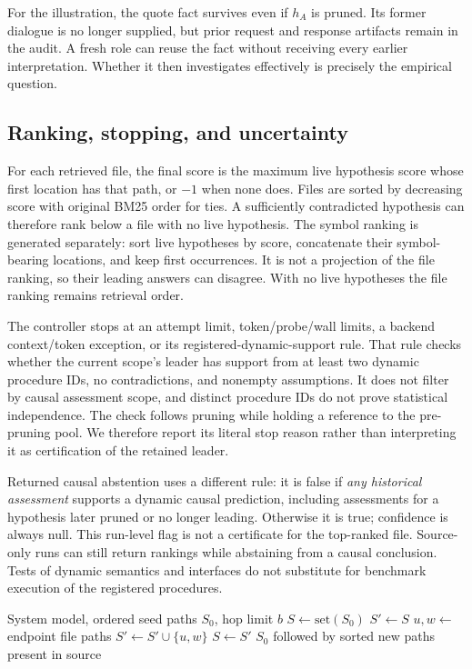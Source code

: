 \documentclass[letterpaper,journal]{IEEEtran}
\newcommand{\code}[1]{\texttt{\detokenize{#1}}}
\begin{document}
For the illustration, the quote fact survives even if $h_A$ is pruned. Its former dialogue is no longer supplied, but prior request and response artifacts remain in the audit. A fresh role can reuse the fact without receiving every earlier interpretation. Whether it then investigates \code{config.py} effectively is precisely the empirical question.

\subsection{Ranking, stopping, and uncertainty}\label{sec:output}
For each retrieved file, the final score is the maximum live hypothesis score whose first location has that path, or $-1$ when none does. Files are sorted by decreasing score with original BM25 order for ties. A sufficiently contradicted hypothesis can therefore rank below a file with no live hypothesis. The symbol ranking is generated separately: sort live hypotheses by score, concatenate their symbol-bearing locations, and keep first occurrences. It is not a projection of the file ranking, so their leading answers can disagree. With no live hypotheses the file ranking remains retrieval order.

The controller stops at an attempt limit, token/probe/wall limits, a backend context/token exception, or its registered-dynamic-support rule. That rule checks whether the current scope's leader has support from at least two dynamic procedure IDs, no contradictions, and nonempty assumptions. It does not filter by causal assessment scope, and distinct procedure IDs do not prove statistical independence. The check follows pruning while holding a reference to the pre-pruning pool. We therefore report its literal stop reason rather than interpreting it as certification of the retained leader.

Returned causal abstention uses a different rule: it is false if \emph{any historical assessment} supports a dynamic causal prediction, including assessments for a hypothesis later pruned or no longer leading. Otherwise it is true; confidence is always null. This run-level flag is not a certificate for the top-ranked file. Source-only runs can still return rankings while abstaining from a causal conclusion. Tests of dynamic semantics and interfaces do not substitute for benchmark execution of the registered procedures.

\begin{algorithm}[t]
\caption{Dependency neighborhood (canonical Algorithm 5)}\label{alg:neighborhood}
\begin{algorithmic}[1]\small
\Require System model, ordered seed paths $S_0$, hop limit $b$
\State $S\gets\mathrm{set}(S_0)$
  \State $S'\gets S$
    \State $u,w\gets$ endpoint file paths
     \State $S'\gets S'\cup\{u,w\}$ \EndIf
  \EndFor
  \State $S\gets S'$
\EndFor
\State \Return $S_0$ followed by sorted new paths present in source
\end{algorithmic}
\end{algorithm}
\end{document}

